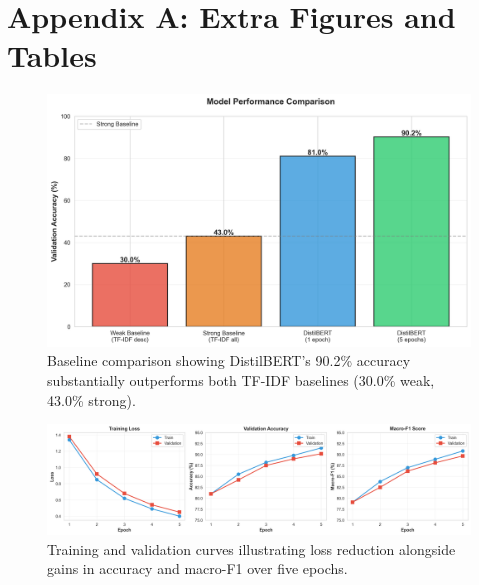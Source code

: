 \documentclass[twocolumn,10pt]{article}
\begin{document}

\appendix

\section*{Appendix A: Extra Figures and Tables}

\begin{figure}[h]
\centering
\includegraphics[width=0.8\columnwidth]{../results/figures/baseline_comparison.png}
\caption{Baseline comparison showing DistilBERT's 90.2\% accuracy substantially outperforms both TF-IDF baselines (30.0\% weak, 43.0\% strong).}
\label{fig:baseline}
\end{figure}

\begin{figure}[h]
\centering
\includegraphics[width=0.8\columnwidth]{../results/figures/training_curves.png}
\caption{Training and validation curves illustrating loss reduction alongside gains in accuracy and macro-F1 over five epochs.}
\label{fig:curves}
\end{figure}
\end{document}
